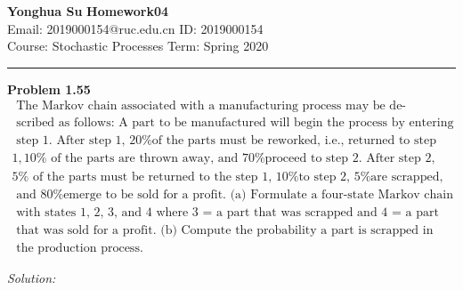 \documentclass[a4paper, 11pt]{article}
\newenvironment{problem}[2][Problem]
    { \begin{mdframed}[backgroundcolor=gray!20] \textbf{#1 #2} \\}
    {  \end{mdframed}}
\newenvironment{solution}
    {\textit{Solution:}}
    {}
\begin{document}
\noindent
\large\textbf{Yonghua Su} \hfill \textbf{Homework04}   \\
Email: 2019000154@ruc.edu.cn \hfill ID: 2019000154 \\
\normalsize Course: Stochastic Processes \hfill Term: Spring 2020\\
\noindent\rule{7in}{2.8pt}
\begin{problem}{1.55}
  \begin{equation*}
  \begin{array}{l}\text { The Markov chain associated with a manufacturing process may be de- } \\ \text { scribed as follows: A part to be manufactured will begin the process by entering } \\ \text { step 1. After step 1, 20\% of the parts must be reworked, i.e., returned to step } \\ 1,10 \% \text { of the parts are thrown away, and 70\% proceed to step 2. After step 2, } \\ 5 \% \text { of the parts must be returned to the step 1, 10\% to step 2, 5\% are scrapped, } \\ \text { and 80\% emerge to be sold for a profit. (a) Formulate a four-state Markov chain } \\ \text { with states 1, 2, 3, and 4 where 3 = a part that was scrapped and 4 = a part } \\ \text { that was sold for a profit. (b) Compute the probability a part is scrapped in } \\ \text { the production process. }\end{array}
  \end{equation*}
\end{problem}

\begin{solution}

\end{solution}
\end{document}
